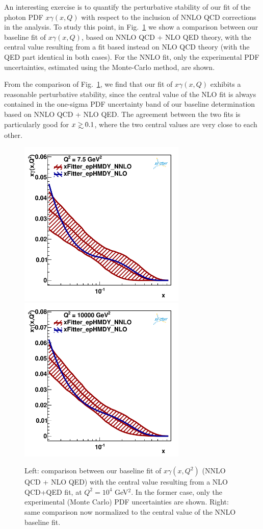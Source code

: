 An interesting exercise is to quantify the perturbative stability of
our fit of the photon PDF $x\gamma(x,Q)$ with respect to the inclusion
of NNLO QCD corrections in the analysis.
%
To study this point, in Fig.~\ref{fig:nlo_vs_nnlo} we show a
comparison between our baseline fit of $x\gamma(x,Q)$, based on NNLO
QCD + NLO QED theory, with the central value resulting from a fit
based instead on NLO QCD theory (with the QED part identical in both
cases).
%
For the NNLO fit, only the experimental PDF uncertainties, estimated
using the Monte-Carlo method, are shown.

From the comparison of Fig.~\ref{fig:nlo_vs_nnlo}, we find that our
fit of $x\gamma(x,Q)$ exhibits a reasonable perturbative stability,
since the central value of the NLO fit is always contained in the
one-sigma PDF uncertainty band of our baseline determination based on
NNLO QCD + NLO QED.
%
The agreement between the two fits is particularly good for
$x\gsim 0.1$, where the two central values are very close to each
other.

\begin{figure}[t]
\centering
\includegraphics[width=8cm]{figs/q2_7_5_pdf_ph_NLOvsNNLO.pdf}
\includegraphics[width=8cm]{figs/q2_10000_pdf_ph_NLOvsNNLO.pdf}
\caption{Left: comparison between our baseline
  fit of $x\gamma(x,Q^2)$ (NNLO QCD + NLO QED) with the central value
  resulting from a NLO QCD+QED fit, at $Q^2=10^4$ GeV$^2$.
  In the former case, only the experimental (Monte Carlo) PDF
  uncertainties are shown.
  Right: same comparison now normalized to the central value of the
  NNLO baseline fit.  }
\label{fig:nlo_vs_nnlo}
\end{figure}
